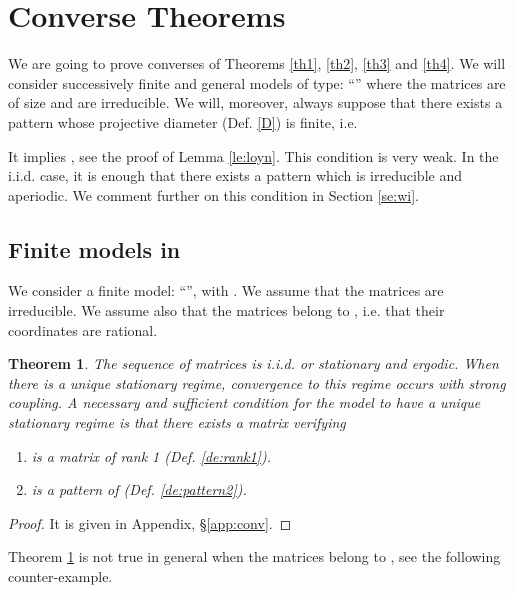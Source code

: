 \documentclass[11pt,titlepage]{article}
\newtheorem{theo}{Theorem }[section]
\begin{document}
\section{Converse Theorems}
\label{se:ct}
We are going to prove converses of Theorems \ref{th1}, \ref{th2}, \ref{th3} and \ref{th4}. We
will consider successively finite 
and general models of type:
``'' where the matrices are of size  and are
 irreducible. We will, moreover, always suppose that there 
exists a pattern whose projective diameter (Def. \ref{D}) is
finite,  i.e.

It implies ,
see the proof of Lemma \ref{le:loyn}.
This condition is very weak. In the i.i.d. case, it is enough
that there exists a pattern which is irreducible and
aperiodic. We comment further on this condition in Section \ref{se:wi}.


\subsection{Finite models in }
We consider a finite model: ``'',
with . We assume that the matrices 
are irreducible. We assume also that the matrices 
belong to , i.e. that their coordinates are
rational. 

\begin{theo}
The sequence of matrices  is  i.i.d. or stationary and ergodic.
When there is
a unique stationary regime, convergence to this regime
occurs with strong coupling. A
necessary and sufficient condition for the 
model to have a unique stationary regime is that there exists a matrix 
verifying 
\begin{enumerate}
\item  is a matrix of rank 1
(Def. \ref{de:rank1}).
\item  is a pattern of  (Def. \ref{de:pattern2}).
\end{enumerate}
\label{conv}
\end{theo}

\begin{proof} 
It is given
in Appendix, \S \ref{app:conv}. 
\end{proof} 

Theorem \ref{conv} is not true in general when the matrices  
belong to , see the following 
counter-example.
\end{document}
